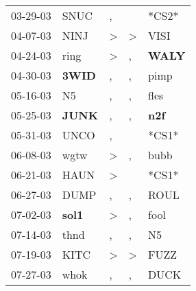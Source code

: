 \begin{supertabular}{p{0.07\textwidth}p{0.06\textwidth}p{0.02\textwidth}p{0.02\textwidth}p{0.06\textwidth}}
          03-29-03\textsuperscript{} &           SNUC\textsuperscript{} &                , &                  &                            *CS2* \\
          04-07-03\textsuperscript{} &           NINJ\textsuperscript{} &     \textgreater &     \textgreater &           VISI\textsuperscript{} \\
          04-24-03\textsuperscript{} &           ring\textsuperscript{} &     \textgreater &                , &  \textbf{WALY\textsuperscript{}} \\
          04-30-03\textsuperscript{} &  \textbf{3WID\textsuperscript{}} &                , &                , &           pimp\textsuperscript{} \\
          05-16-03\textsuperscript{} &             N5\textsuperscript{} &                , &                , &           fles\textsuperscript{} \\
          05-25-03\textsuperscript{} &  \textbf{JUNK\textsuperscript{}} &                , &                , &   \textbf{n2f\textsuperscript{}} \\
          05-31-03\textsuperscript{} &           UNCO\textsuperscript{} &                , &                  &                            *CS1* \\
          06-08-03\textsuperscript{} &           wgtw\textsuperscript{} &     \textgreater &                , &           bubb\textsuperscript{} \\
          06-21-03\textsuperscript{} &           HAUN\textsuperscript{} &     \textgreater &                  &                            *CS1* \\
          06-27-03\textsuperscript{} &           DUMP\textsuperscript{} &                , &                , &           ROUL\textsuperscript{} \\
          07-02-03\textsuperscript{} &  \textbf{sol1\textsuperscript{}} &     \textgreater &                , &           fool\textsuperscript{} \\
          07-14-03\textsuperscript{} &           thnd\textsuperscript{} &                , &                , &             N5\textsuperscript{} \\
          07-19-03\textsuperscript{} &           KITC\textsuperscript{} &     \textgreater &     \textgreater &           FUZZ\textsuperscript{} \\
          07-27-03\textsuperscript{} &           whok\textsuperscript{} &                , &                , &           DUCK\textsuperscript{} \\

\end{supertabular}
